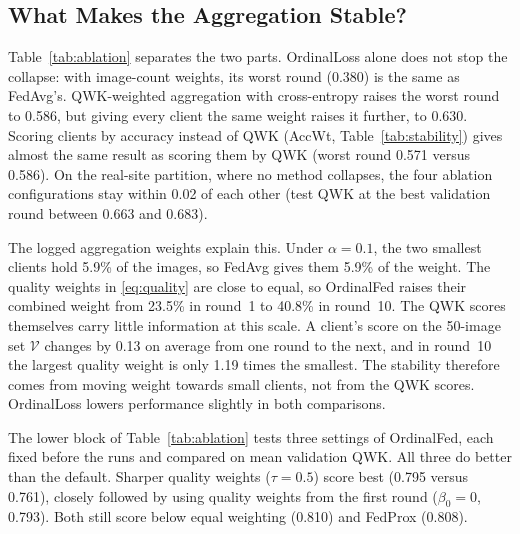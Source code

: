 \subsection{What Makes the Aggregation Stable?}

Table~\ref{tab:ablation} separates the two parts. OrdinalLoss alone does not stop
the collapse: with image-count weights, its worst round (0.380) is the same as
FedAvg's. QWK-weighted aggregation with cross-entropy raises the worst round to
0.586, but giving every client the same weight raises it further, to 0.630. Scoring
clients by accuracy instead of QWK (AccWt, Table~\ref{tab:stability}) gives almost
the same result as scoring them by QWK (worst round 0.571 versus 0.586). On the
real-site partition, where no method collapses, the four ablation configurations
stay within 0.02 of each other (test QWK at the best validation round between 0.663
and 0.683).

The logged aggregation weights explain this. Under $\alpha=0.1$, the two smallest
clients hold 5.9\% of the images, so FedAvg gives them 5.9\% of the weight. The
quality weights in \eqref{eq:quality} are close to equal, so OrdinalFed raises
their combined weight from 23.5\% in round~1 to 40.8\% in round~10. The QWK scores
themselves carry little information at this scale. A client's score on the
50-image set $\mathcal{V}$ changes by 0.13 on average from one round to the next,
and in round~10 the largest quality weight is only 1.19 times the smallest. The
stability therefore comes from moving weight towards small clients, not from the
QWK scores. OrdinalLoss lowers performance slightly in both comparisons.

The lower block of Table~\ref{tab:ablation} tests three settings of OrdinalFed,
each fixed before the runs and compared on mean validation QWK. All three do
better than the default. Sharper quality weights ($\tau=0.5$) score best (0.795
versus 0.761), closely followed by using quality weights from the first round
($\beta_0=0$, 0.793). Both still score below equal weighting (0.810) and FedProx
(0.808).

